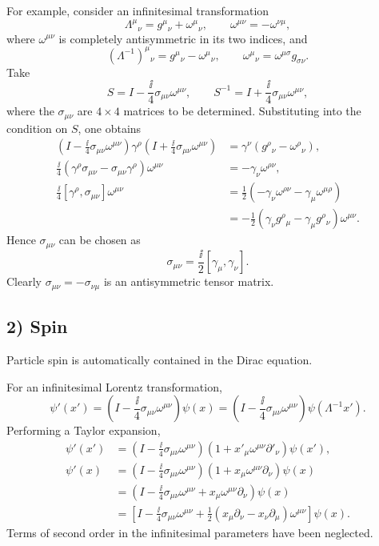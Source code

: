 For example, consider an infinitesimal transformation
\[
\Lambda^\mu{}_{\nu}=g^\mu{}_{\nu}+\omega^\mu{}_{\nu},
\qquad \omega^{\mu\nu}=-\omega^{\nu\mu},
\]
where $\omega^{\mu\nu}$ is completely antisymmetric in its two indices, and
\[
(\Lambda^{-1})^\mu{}_{\nu}=g^\mu{}_{\nu}-\omega^\mu{}_{\nu},
\qquad\omega^\mu{}_{\nu}=\omega^{\mu\sigma}g_{\sigma\nu}.
\]
Take
\[
S=I-\frac{\ii}{4}\sigma_{\mu\nu}\omega^{\mu\nu},\qquad
S^{-1}=I+\frac{\ii}{4}\sigma_{\mu\nu}\omega^{\mu\nu},
\]
where the $\sigma_{\mu\nu}$ are $4\times4$ matrices to be determined. Substituting into the condition on $S$, one obtains
\begin{align*}
\left(I-\frac{\ii}{4}\sigma_{\mu\nu}\omega^{\mu\nu}\right)
\gamma^\rho
\left(I+\frac{\ii}{4}\sigma_{\mu\nu}\omega^{\mu\nu}\right)
&=\gamma^\nu(g^\rho{}_{\nu}-\omega^\rho{}_{\nu}),\\
\frac{\ii}{4}(\gamma^\rho\sigma_{\mu\nu}-\sigma_{\mu\nu}\gamma^\rho)\omega^{\mu\nu}
&=-\gamma_\nu\omega^{\rho\nu},\\
\frac{\ii}{4}[\gamma^\rho,\sigma_{\mu\nu}]\omega^{\mu\nu}
&=\frac12(-\gamma_\nu\omega^{\rho\nu}-\gamma_\mu\omega^{\mu\rho})\\
&=-\frac12(\gamma_\nu g^\rho{}_{\mu}-\gamma_\mu g^\rho{}_{\nu})\omega^{\mu\nu}.
\end{align*}
Hence $\sigma_{\mu\nu}$ can be chosen as
\[
\sigma_{\mu\nu}=\frac{\ii}{2}[\gamma_\mu,\gamma_\nu].
\]
Clearly $\sigma_{\mu\nu}=-\sigma_{\nu\mu}$ is an antisymmetric tensor matrix.

\subsection*{2) Spin}
Particle spin is automatically contained in the Dirac equation.

For an infinitesimal Lorentz transformation,
\[
\psi'(x')=\left(I-\frac{\ii}{4}\sigma_{\mu\nu}\omega^{\mu\nu}\right)\psi(x)
=\left(I-\frac{\ii}{4}\sigma_{\mu\nu}\omega^{\mu\nu}\right)\psi(\Lambda^{-1}x').
\]
Performing a Taylor expansion,
\begin{align*}
\psi'(x')
&=\left(I-\frac{\ii}{4}\sigma_{\mu\nu}\omega^{\mu\nu}\right)
\left(1+x'_\mu\omega^{\mu\nu}\partial'_\nu\right)\psi(x'),\\
\psi'(x)
&=\left(I-\frac{\ii}{4}\sigma_{\mu\nu}\omega^{\mu\nu}\right)
\left(1+x_\mu\omega^{\mu\nu}\partial_\nu\right)\psi(x)\\
&=\left(I-\frac{\ii}{4}\sigma_{\mu\nu}\omega^{\mu\nu}
+x_\mu\omega^{\mu\nu}\partial_\nu\right)\psi(x)\\
&=\left[I-\frac{\ii}{4}\sigma_{\mu\nu}\omega^{\mu\nu}
+\frac12(x_\mu\partial_\nu-x_\nu\partial_\mu)\omega^{\mu\nu}\right]\psi(x).
\end{align*}
Terms of second order in the infinitesimal parameters have been neglected.

